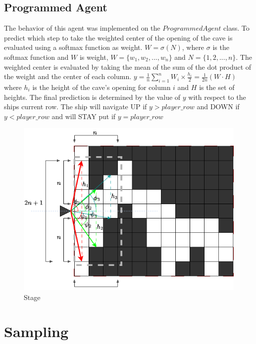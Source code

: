 \documentclass[10pt,journal,compsoc]{IEEEtran}
\begin{document}
\subsection{Programmed Agent}

The behavior of this agent was implemented on the $ProgrammedAgent$ class. To predict which step to take the
weighted center of the opening of the cave is evaluated using a softmax function as weight. $W = \sigma(N)$,
where $\sigma$ is the softmax function and $W$ is weight, $W = \{w_1, w_2, ..., w_n\}$ and $N = \{1, 2, ..., 
n\}$. The weighted center is evaluated by taking the mean of the sum of the dot product of the weight and 
the center of each column. $y = \frac{1}{n}\sum\limits_{i=1}^{n}W_i \times \frac{h_i}{2} = \frac{1}{2n}
(W \cdot H)$ where $h_i$ is the height of the cave's opening for column $i$ and $H$ is the set of heights. 
The final prediction is determined by the value of $y$ with 
respect to the ships current row. The ship will navigate UP if $y > player\_row$ and DOWN if $y 
< player\_row$ and will STAY put if $y = player\_row$

\begin{figure}
    \centering
    \includegraphics[width=\linewidth]{stage.png}
    \caption{Stage}
    \label{fig:stage}
\end{figure}

\section{Sampling}
\end{document}
